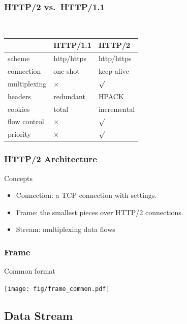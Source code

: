 \documentclass[lualatex]{beamer}
\begin{document}
\begin{frame}
  \frametitle{HTTP/2 vs.\ HTTP/1.1}

  \begin{block}{~}
    \begin{center}
      \begin{tabular}{|l|l|l|}
        \hline
        ~& HTTP/1.1 & HTTP/2\\
        \hline
        scheme & http/https & http/https \\
        connection & one-shot & keep-alive\\
        multiplexing & $\times$ & $\surd$\\
        headers & redundant & HPACK\\
        cookies & total & incremental\\
        flow control & $\times$ & $\surd$\\
        priority & $\times$ & $\surd$\\
        \hline
      \end{tabular}
    \end{center}
  \end{block}
\end{frame}

\begin{frame}
  \frametitle{HTTP/2 Architecture}

  \begin{block}{Concepts}
    \begin{itemize}
    \item Connection: a TCP connection with settings.
    \item Frame: the smallest pieces over HTTP/2 connections.
    \item Stream: multiplexing data flows
    \end{itemize}
  \end{block}
\end{frame}

\begin{frame}
  \frametitle{Frame}
  \begin{block}{Common format}
    \begin{center}
      \texttt{[image: fig/frame\_common.pdf]}
    \end{center}
  \end{block}
\end{frame}

\subsection{Data Stream}
\end{document}
